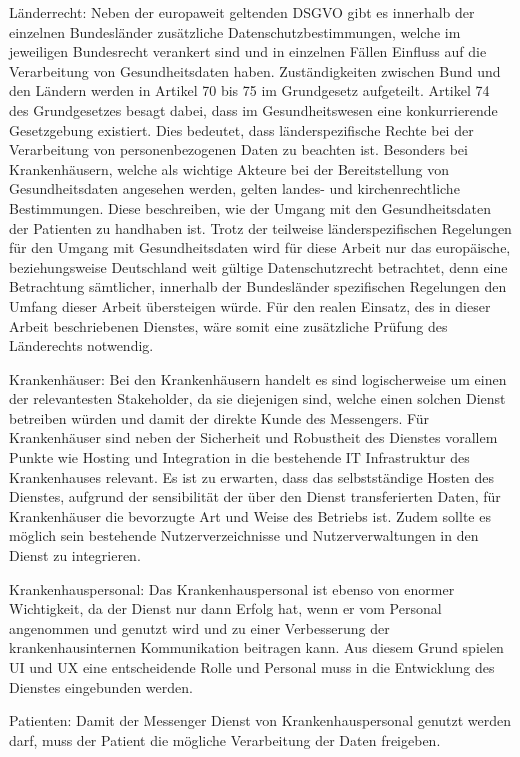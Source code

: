 Länderrecht: Neben der europaweit geltenden DSGVO gibt es innerhalb der einzelnen Bundesländer zusätzliche Datenschutzbestimmungen, welche im jeweiligen Bundesrecht verankert sind und in einzelnen Fällen Einfluss auf die Verarbeitung von Gesundheitsdaten haben.
Zuständigkeiten zwischen Bund und den Ländern werden in Artikel 70 bis 75 im Grundgesetz aufgeteilt. Artikel 74 des Grundgesetzes besagt dabei, dass im Gesundheitswesen eine konkurrierende Gesetzgebung existiert. Dies bedeutet, dass länderspezifische Rechte bei der Verarbeitung von personenbezogenen Daten zu beachten ist. Besonders bei Krankenhäusern, welche als wichtige Akteure bei der Bereitstellung von Gesundheitsdaten angesehen werden, gelten landes- und kirchenrechtliche Bestimmungen. Diese beschreiben, wie der Umgang mit den Gesundheitsdaten der Patienten zu handhaben ist. 
Trotz der teilweise länderspezifischen Regelungen für den Umgang mit Gesundheitsdaten wird für diese Arbeit nur das europäische, beziehungsweise Deutschland weit gültige Datenschutzrecht betrachtet, denn eine Betrachtung sämtlicher, innerhalb der Bundesländer spezifischen Regelungen den Umfang dieser Arbeit übersteigen würde. Für den realen Einsatz, des in dieser Arbeit beschriebenen Dienstes, wäre somit eine zusätzliche Prüfung des Länderechts notwendig.

Krankenhäuser: Bei den Krankenhäusern handelt es sind logischerweise um einen der relevantesten Stakeholder, da sie diejenigen sind, welche einen solchen Dienst betreiben würden und damit der direkte Kunde des Messengers. Für Krankenhäuser sind neben der Sicherheit und Robustheit des Dienstes vorallem Punkte wie Hosting und Integration in die bestehende IT Infrastruktur des Krankenhauses relevant. 
Es ist zu erwarten, dass das selbstständige Hosten des Dienstes, aufgrund der sensibilität der über den Dienst transferierten Daten, für Krankenhäuser die bevorzugte Art und Weise des Betriebs ist. Zudem sollte es möglich sein bestehende Nutzerverzeichnisse und Nutzerverwaltungen in den Dienst zu integrieren.

Krankenhauspersonal: Das Krankenhauspersonal ist ebenso von enormer Wichtigkeit, da der Dienst nur dann Erfolg hat, wenn er vom Personal angenommen und genutzt wird und zu einer Verbesserung der krankenhausinternen Kommunikation beitragen kann. Aus diesem Grund spielen UI und UX eine entscheidende Rolle und Personal muss in die Entwicklung des Dienstes eingebunden werden.

Patienten: Damit der Messenger Dienst von Krankenhauspersonal genutzt werden darf, muss der Patient die mögliche Verarbeitung der Daten freigeben.

